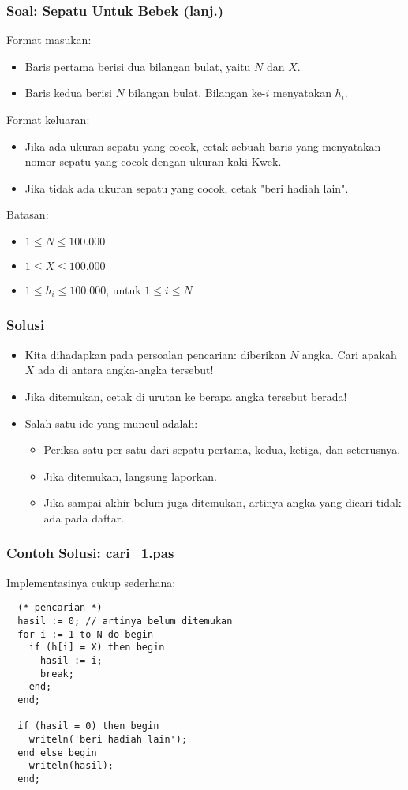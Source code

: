 \documentclass{beamer}
\begin{document}
\begin{frame}
\frametitle{Soal: Sepatu Untuk Bebek (lanj.)}
Format masukan:
\begin{itemize}
  \item Baris pertama berisi dua bilangan bulat, yaitu $N$ dan $X$.
  \item Baris kedua berisi $N$ bilangan bulat. Bilangan ke-$i$ menyatakan $h_i$.
\end{itemize}
Format keluaran:
\begin{itemize}
  \item Jika ada ukuran sepatu yang cocok, cetak sebuah baris yang menyatakan nomor sepatu yang cocok dengan ukuran kaki Kwek.
  \item Jika tidak ada ukuran sepatu yang cocok, cetak "beri hadiah lain".
\end{itemize}
Batasan:
\begin{itemize}
  \item $1 \le N \le 100.000$
  \item $1 \le X \le 100.000$
  \item $1 \le h_i \le 100.000$, untuk $1 \le i \le N$
\end{itemize}
\end{frame}

\begin{frame}
\frametitle{Solusi}
\begin{itemize}
  \item Kita dihadapkan pada persoalan pencarian: diberikan $N$ angka. Cari apakah $X$ ada di antara angka-angka tersebut!
  \item Jika ditemukan, cetak di urutan ke berapa angka tersebut berada!
  \item Salah satu ide yang muncul adalah:
  \begin{itemize}
    \item Periksa satu per satu dari sepatu pertama, kedua, ketiga, dan seterusnya.
    \item Jika ditemukan, langsung laporkan.
    \item Jika sampai akhir belum juga ditemukan, artinya angka yang dicari tidak ada pada daftar.
  \end{itemize}
\end{itemize}
\end{frame}

\begin{frame}[fragile]
\frametitle{Contoh Solusi: cari\_1.pas}
Implementasinya cukup sederhana:
\begin{lstlisting}
  (* pencarian *)
  hasil := 0; // artinya belum ditemukan
  for i := 1 to N do begin
    if (h[i] = X) then begin
      hasil := i;
      break;
    end;
  end;

  if (hasil = 0) then begin
    writeln('beri hadiah lain');
  end else begin
    writeln(hasil);
  end;
\end{lstlisting}
\end{frame}
\end{document}
